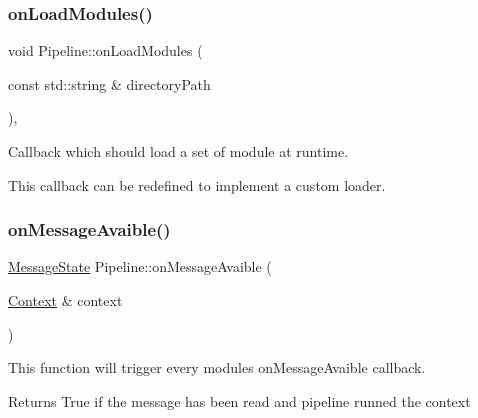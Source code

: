\subsubsection{\texorpdfstring{onLoadModules()}{onLoadModules()}}
{\footnotesize\ttfamily void Pipeline\+::on\+Load\+Modules (\begin{DoxyParamCaption}\item[{const std\+::string \&}]{directory\+Path }\end{DoxyParamCaption})\hspace{0.3cm}{\ttfamily [protected]}, {\ttfamily [virtual]}}



Callback which should load a set of module at runtime. 

This callback can be redefined to implement a custom loader. \mbox{\label{classo_z_1_1_pipeline_a9268d41077921fdb894aaf4cfa70d704}} 
\subsubsection{\texorpdfstring{onMessageAvaible()}{onMessageAvaible()}}
{\footnotesize\ttfamily \mbox{\hyperlink{namespaceo_z_aca1addfd2374772c2b5db4bc5a96422c}{Message\+State}} Pipeline\+::on\+Message\+Avaible (\begin{DoxyParamCaption}\item[{\mbox{\hyperlink{classo_z_1_1_context}{Context}} \&}]{context }\end{DoxyParamCaption})\hspace{0.3cm}{\ttfamily [virtual]}}



This function will trigger every module\textquotesingle{}s \textquotesingle{}on\+Message\+Avaible\textquotesingle{} callback. 

\begin{DoxyReturn}{Returns}
True if the message has been read and pipeline runned the context 
\end{DoxyReturn}
\mbox{\label{classo_z_1_1_pipeline_a869b02b2b8953993ccfb882a3e1f3a0f}} 
